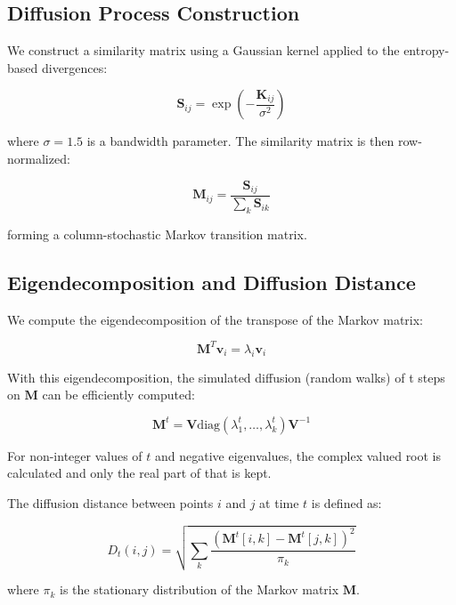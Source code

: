 \documentclass[12pt,a4paper]{article}
\begin{document}
\subsection{Diffusion Process Construction}

We construct a similarity matrix using a Gaussian kernel applied to the entropy-based divergences:

\begin{equation}
\mathbf{S}_{ij} = \exp\left(-\frac{\mathbf{K}_{ij}}{\sigma^2}\right)
\end{equation}

where $\sigma = 1.5$ is a bandwidth parameter. The similarity matrix is then row-normalized:

\begin{equation}
\mathbf{M}_{ij} = \frac{\mathbf{S}_{ij}}{\sum_{k} \mathbf{S}_{ik}}
\end{equation}

forming a column-stochastic Markov transition matrix.

\subsection{Eigendecomposition and Diffusion Distance}

We compute the eigendecomposition of the transpose of the Markov matrix:

\begin{equation}
\mathbf{M}^T \mathbf{v}_i = \lambda_i \mathbf{v}_i
\end{equation}

With this eigendecomposition, the simulated diffusion (random walks) of t steps on $\mathbf{M}$ can be efficiently computed:

\begin{equation}
\mathbf{M}^t = \mathbf{V} \text{diag}(\lambda_1^t, \ldots, \lambda_k^t) \mathbf{V}^{-1}
\end{equation}

For non-integer values of $t$ and negative eigenvalues, the complex valued root is calculated and only the real part of that is kept.

The diffusion distance \cite{coifman2006diffusion} between points $i$ and $j$ at time $t$ is defined as:

\begin{equation}
D_t(i,j) = \sqrt{\sum_{k} \frac{(\mathbf{M}^t[i,k] - \mathbf{M}^t[j,k])^2}{\pi_k}}
\end{equation}

where $\pi_k$ is the stationary distribution of the Markov matrix $\mathbf{M}$.
\end{document}

